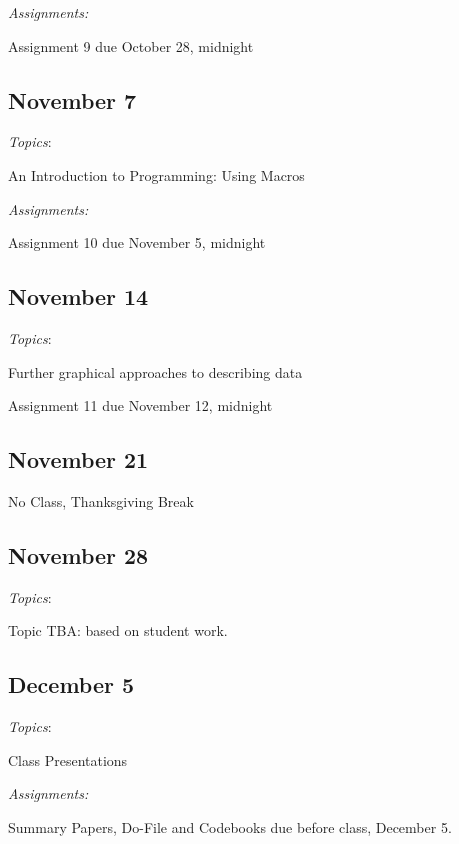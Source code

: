 \documentclass[12pt]{article}
\begin{document}
\begin{flushleft}
\textit {Assignments:}

Assignment 9 due October 28, midnight

\subsection{November 7}


\textit{Topics}:

An Introduction to Programming: Using Macros

\textit {Assignments:}

Assignment 10 due November 5, midnight

\subsection{November 14}

\textit{Topics}:

Further graphical approaches to describing data 

Assignment 11 due November 12, midnight

\subsection{November 21}

No Class, Thanksgiving Break


\subsection{November 28}


\textit{Topics}:

Topic TBA: based on student work. 


\subsection{December 5}

\textit{Topics}:

Class Presentations

\textit {Assignments:}

Summary Papers, Do-File and Codebooks due before class, December 5. 


\end{flushleft}
\end{document}
